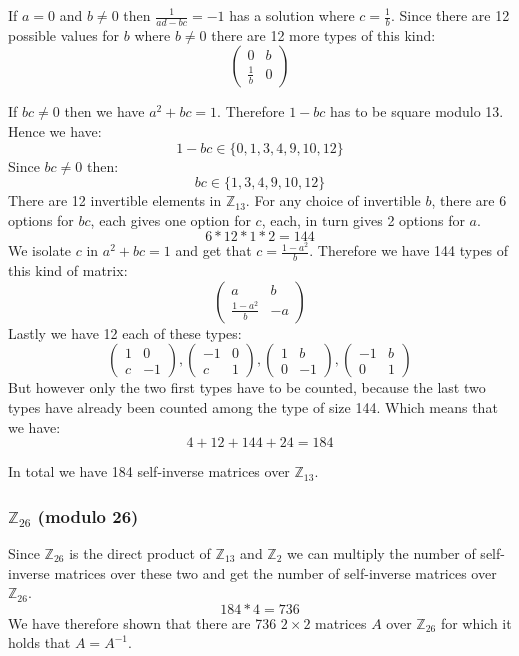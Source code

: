 \documentclass[11pt]{report}
\begin{document}
If $a = 0$ and $b \neq 0$ then $\frac{1}{ad - bc} = -1$ has a solution where $c=\frac{1}{b}$. Since there are 12 possible values for $b$ where $b \neq 0$ there are 12 more types of this kind:\\
$$\begin{pmatrix}
0 & b\\
\frac{1}{b} & 0
\end{pmatrix}$$

If $bc \neq 0$ then we have $a^2 + bc = 1$. Therefore $1 - bc$ has to be square modulo 13. Hence we have:\\
$$1 - bc \in \{0,1,3,4,9,10,12\}$$
Since $bc \neq 0$ then:
$$bc \in \{1,3,4,9,10,12\}$$
There are 12 invertible elements in $\mathbb{Z}_{13}$. For any choice of invertible $b$, there are 6 options for $bc$, each gives one option for $c$, each, in turn gives 2 options for $a$.\\
$$6 * 12 * 1 * 2 = 144$$
We isolate $c$ in $a^2 + bc = 1$ and get that $c = \frac{1-a^2}{b}$. Therefore we have 144 types of this kind of matrix:\\
$$\begin{pmatrix}
a & b\\
\frac{1-a^2}{b} & -a
\end{pmatrix}$$
Lastly we have 12 each of these types:
$$
\begin{pmatrix}
1 & 0\\
c & -1
\end{pmatrix}
,
\begin{pmatrix}
-1 & 0\\
c & 1
\end{pmatrix}
,
\begin{pmatrix}
1 & b\\
0 & -1
\end{pmatrix}
,
\begin{pmatrix}
-1 & b\\
0 & 1
\end{pmatrix}
$$
But however only the two first types have to be counted, because the last two types have already been counted among the type of size 144. Which means that we have:
$$4 + 12 + 144 + 24 = 184$$

In total we have 184 self-inverse matrices over $\mathbb{Z}_{13}$.

\subsubsection*{$\mathbb{Z}_{26}$ (modulo 26)}
Since $\mathbb{Z}_{26}$ is the direct product of $\mathbb{Z}_{13}$ and $\mathbb{Z}_{2}$ we can multiply the number of self-inverse matrices over these two and get the number of self-inverse matrices over $\mathbb{Z}_{26}$.
$$184 * 4 = 736$$
We have therefore shown that there are 736 $2 \times 2$ matrices $A$ over $\mathbb{Z}_{26}$ for which it holds that $A= A^{-1}$.
\end{document}
